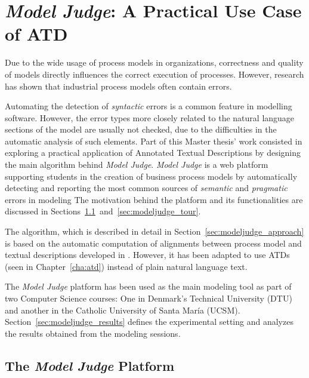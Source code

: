 \chapter{\emph{Model Judge}: A Practical Use Case of ATD}
\label{cha:modeljudge}

Due to the wide usage of process models in organizations, correctness and
quality of models directly influences the correct execution of processes.
However, research has shown that industrial process models often
contain errors\cite{citation needed}.

Automating the detection of \emph{syntactic} errors is a common feature in 
modelling software. However, the error types more closely related to the
natural language sections of the model are usually not checked, due to the
difficulties in the automatic analysis of such elements. Part of this
Master thesis' work consisted in exploring a practical application of Annotated
Textual Descriptions by designing the main algorithm behind \emph{Model
  Judge}\cite{citation needed}. \emph{Model Judge} is a web platform supporting
students in the creation of business process models by automatically detecting
and reporting the most common sources of \emph{semantic} and \emph{pragmatic}
errors in modeling The motivation behind the platform and its functionalities
are discussed in
Sections~\ref{sec:modeljudge_description}~and~\ref{sec:modeljudge_tour}.



The algorithm, which is described in detail in
Section~\ref{sec:modeljudge_approach} is based on the automatic computation of
alignments between process model and textual descriptions developed in
\cite{10.1007/978-3-319-59536-8_26}.
However, it has been adapted to use
ATDs (seen in Chapter~\ref{cha:atd}) instead of plain natural language text.

The \emph{Model Judge} platform has been used as the main modeling tool as
part of two Computer Science courses: One in Denmark's Technical University
(DTU) and another in the Catholic University of Santa Mar\'ia (UCSM).
Section~\ref{sec:modeljudge_results} defines the experimental setting and
analyzes the results obtained from the modeling sessions.

\section{The \emph{Model Judge} Platform}
\label{sec:modeljudge_description}
 


